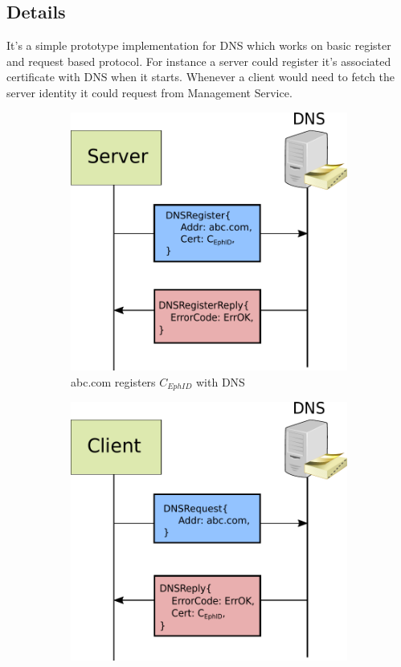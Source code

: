 \subsection{Details}
It's a simple prototype implementation for DNS which works on basic register and request based protocol. For instance a server could register it's associated certificate with DNS when it starts. Whenever a client would need to fetch the server identity it could request from Management Service.

\begin{figure}[th!]
\centering
\begin{subfigure}{.5\textwidth}
  \centering
  \includegraphics[width=0.95\linewidth]{Figures/dns_register.pdf}
  \caption[DNS Register Domain]{abc.com registers $C_{EphID}$ with DNS}
  \label{fig:dns_register}
\end{subfigure}%
\begin{subfigure}{.5\textwidth}
  \centering
  \includegraphics[width=0.95\linewidth]{Figures/dns_request.pdf}

\end{subfigure}
\end{figure}
